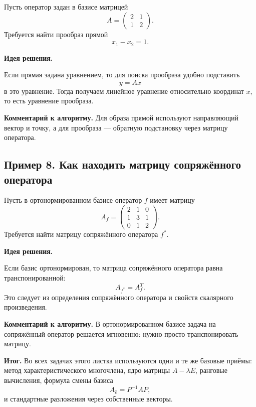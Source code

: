 Пусть оператор задан в базисе матрицей
\[
A=\begin{pmatrix}
2 & 1\\
1 & 2
\end{pmatrix}.
\]
Требуется найти прообраз прямой
\[
x_1-x_2=1.
\]

\textbf{Идея решения.}

Если прямая задана уравнением, то для поиска прообраза удобно подставить
\[
y=Ax
\]
в это уравнение. Тогда получаем линейное уравнение относительно координат $x$, то есть уравнение прообраза.

\medskip
\noindent
\textbf{Комментарий к алгоритму.}
Для образа прямой используют направляющий вектор и точку, а для прообраза --- обратную подстановку через матрицу оператора.

\subsection*{Пример 8. Как находить матрицу сопряжённого оператора}

Пусть в ортонормированном базисе оператор $f$ имеет матрицу
\[
A_f=
\begin{pmatrix}
2 & 1 & 0\\
1 & 3 & 1\\
0 & 1 & 2
\end{pmatrix}.
\]
Требуется найти матрицу сопряжённого оператора $f^*$.

\textbf{Идея решения.}

Если базис ортонормирован, то матрица сопряжённого оператора равна транспонированной:
\[
A_{f^*}=A_f^T.
\]
Это следует из определения сопряжённого оператора и свойств скалярного произведения.

\medskip
\noindent
\textbf{Комментарий к алгоритму.}
В ортонормированном базисе задача на сопряжённый оператор решается мгновенно: нужно просто транспонировать матрицу.

\medskip
\noindent
\textbf{Итог.}
Во всех задачах этого листка используются одни и те же базовые приёмы:
метод характеристического многочлена, ядро матрицы $A-\lambda E$, ранговые вычисления, формула смены базиса
\[
A_{\hat e}=P^{-1}AP,
\]
и стандартные разложения через собственные векторы.

